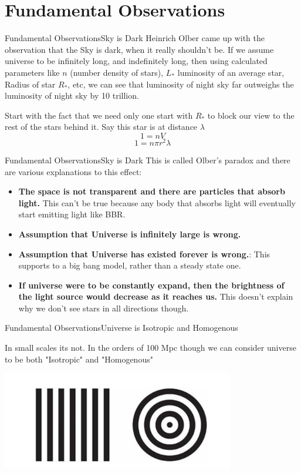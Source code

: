 \section{Fundamental Observations}

\begin{frame}{Fundamental Observations}{Sky is Dark}
	Heinrich Olber came up with the observation that
	the Sky is dark, when it really shouldn't be. If we assume universe
	to be infinitely long, and indefinitely long, then using calculated
	parameters like $n$ (number density of stars), $L_*$ luminosity of
	an average star, Radius of star $R_*$, etc, we can see that luminosity of night sky far outweighs the
	luminosity of night sky by 10 trillion.

	Start with the fact that we need only one start with $R_*$ to block
	our view to the rest of the stars behind it. Say this star is at
	distance $\lambda$
	$$ 1 = n V $$
	$$ 1 = n \pi r^2 \lambda $$
\end{frame}

\begin{frame}{Fundamental Observations}{Sky is Dark}
This is called Olber's paradox and there are various explanations to this
effect:
\begin{itemize}[<+->]
	\item \textbf{The space is not transparent and there are particles that absorb
		light.} This can't be true because any body that absorbs light
		will eventually start emitting light like BBR.
	\item \textbf{Assumption that Universe is infinitely large is wrong.}
	\item \textbf{Assumption that Universe has existed forever is wrong.}:
		This supports to a big bang model, rather than a steady state one.
	\item \textbf{If universe were to be constantly expand, then the
		brightness of the light source would decrease as it reaches us.}
		This doesn't explain why we don't see stars in all directions
		though.
\end{itemize}
\end{frame}


\begin{frame}{Fundamental Observations}{Universe is Isotropic and Homogenous}

In small scales its not. In the orders of 100 Mpc though we can consider
universe to be both "Isotropic" and "Homogenous"

\includegraphics[width=4in]{1}

\end{frame}

